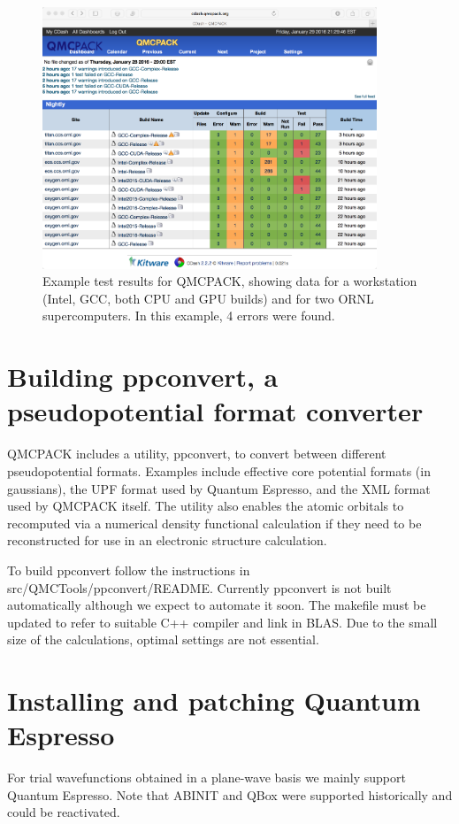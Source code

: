 \begin{figure}
  \centering
  \includegraphics[width=10cm]{figures/QMCPACK_CDash_CTest_Results_20160129.png}
  \caption{Example test results for QMCPACK, showing data for a
    workstation (Intel, GCC, both CPU and GPU builds) and for two ORNL
    supercomputers. In this example, 4 errors were found.}
  \label{fig:cdash}
\end{figure}

\section{Building ppconvert, a pseudopotential format converter}
\label{sec:buildppconvert}
QMCPACK includes a utility, ppconvert, to convert between different
pseudopotential formats. Examples include effective core potential
formats (in gaussians), the UPF format used by Quantum Espresso, and
the XML format used by QMCPACK itself. The utility also enables the
atomic orbitals to recomputed via a numerical density functional
calculation if they need to be reconstructed for use in an
electronic structure calculation.

To build ppconvert follow the instructions in
src/QMCTools/ppconvert/README. Currently ppconvert is not built
automatically although we expect to automate it soon. The makefile
must be updated to refer to suitable C++ compiler and link in
BLAS. Due to the small size of the calculations, optimal settings are
not essential.

\section{Installing and patching Quantum Espresso}
\label{sec:buildqe}
For trial wavefunctions obtained in a plane-wave basis we mainly
support Quantum Espresso. Note that ABINIT and QBox were supported historically
and could be reactivated.

